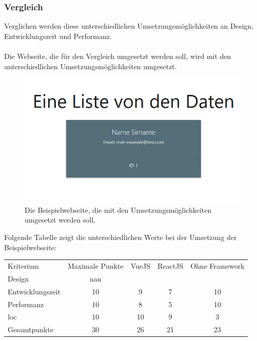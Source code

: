 \subsubsection{Vergleich}
Verglichen werden diese unterschiedlichen Umsetzungsmöglichkeiten an Design, Entwicklungszeit und Performanz.\\\\
Die Webseite, die für den Vergleich umgesetzt werden soll, wird mit den unterschiedlichen Umsetzungsmöglichkeiten umgesetzt.\\
\begin{figure}[H]
	\centering
	\includegraphics[width=0.8\linewidth]{images/example_page}
	\caption[Die Beispielwebseite]{Die Beispielwebseite, die mit den Umsetzungsmöglichkeiten umgesetzt werden soll.}
	\label{fig:example}
\end{figure}
Folgende Tabelle zeigt die unterschiedlichen Werte bei der Umsetzung der Beispielwebseite:
\begin{table}
	\centering
	\label{center}
	\begin{tabular}{lcccc}
		Kriterium        & \multicolumn{1}{l}{Maximale Punkte} & \multicolumn{1}{l}{VueJS} & \multicolumn{1}{l}{ReactJS} & \multicolumn{1}{l}{Ohne Framework}  \\
		Design           & \Gls{nan}                        &            \checkmark               &             \checkmark              &          \checkmark                           \\
		Entwicklungszeit & 10                         &             9              &               7            &               10                      \\
		Performanz       & 10                         &             8              &               5            &                 10                    \\
		\Gls{loc}              & 10                         &             10              &               9            &                   3                  \\
		Gesamtpunkte     & 30                         &              26             &               21            &                23                    
	\end{tabular}
\end{table}
